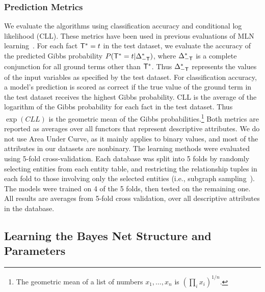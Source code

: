 \documentclass[twoside,11pt]{article}
\begin{document}
\subsubsection{Prediction Metrics}
We evaluate the algorithms using classification
accuracy and conditional log likelihood (CLL). These metrics have been used in previous evaluations of MLN learning~\cite{Domingos2007,Schulte2012}.  For each fact $\mathsf{T}^{*}\hspace{0.0ex} = t$ in the test dataset, we evaluate the accuracy of the predicted Gibbs probability $P(\mathsf{T}^{*}\hspace{0.0ex} = t | \Delta_{-\mathsf{T}}^{*}\hspace{0.0ex})$, where $\Delta_{-\mathsf{T}}^{*}\hspace{0.0ex}$ is a complete conjunction for all ground terms other than $\mathsf{T}^{*}\hspace{0.0ex}$. Thus $\Delta_{-\mathsf{T}}^{*}\hspace{0.0ex}$ represents the values of the input variables as specified by the test dataset.
For classification accuracy, a model's prediction is scored as correct if the true value of the ground term in the test dataset receives the highest Gibbs probability. 
CLL is the average of the logarithm of the Gibbs probability for each fact in the test dataset. Thus $\exp(CLL)$ is the geometric mean of the Gibbs probabilities.\footnote{The geometric mean of a list of numbers $x_{1},\ldots,x_{n}$ is $(\prod_{i} x_{i})^{1/n}$.}
Both metrics are reported as averages over all functors that represent descriptive attributes. We do not use Area Under Curve, as it mainly applies to binary values, and most of the attributes in our datasets are nonbinary.
The learning methods were evaluated using 5-fold cross-validation. Each database was split into 5 folds by randomly selecting entities from each entity table, and restricting the relationship tuples in each fold to those involving only the selected entities  (i.e., subgraph sampling~\cite{Frank1977,Schulte2012}). The models were trained on 4 of the 5 folds, then tested on the remaining one. All results are averages from 5-fold cross validation, over all descriptive attributes in the database. 


\subsection{Learning the Bayes Net Structure and Parameters}
\end{document}
